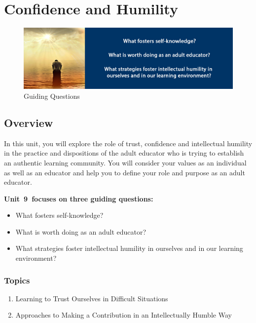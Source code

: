 \documentclass[
]{book}
\providecommand{\tightlist}{%
  \setlength{\itemsep}{0pt}\setlength{\parskip}{0pt}}
\begin{document}
\hypertarget{confidence-and-humility}{%
\chapter{Confidence and Humility}\label{confidence-and-humility}}

\begin{figure}
\centering
\includegraphics{assets/unit9/BannerUnit9.jpg}
\caption{Guiding Questions}
\end{figure}

\hypertarget{overview-8}{%
\section*{Overview}\label{overview-8}}

In this unit, you will explore the role of trust, confidence and intellectual humility in the practice and dispositions of the adult educator who is trying to establish an authentic learning community. You will consider your values as an individual as well as an educator and help you to define your role and purpose as an adult educator.

\textbf{Unit~9~focuses on three guiding questions:}

\begin{itemize}
\tightlist
\item
  What fosters self-knowledge?\\
\item
  What is worth doing as an adult educator?
\item
  What strategies foster intellectual humility in ourselves and in our learning environment?
\end{itemize}

\hypertarget{topics-8}{%
\subsection*{Topics}\label{topics-8}}

\begin{enumerate}
\def\labelenumi{\arabic{enumi}.}
\tightlist
\item
  Learning to Trust Ourselves in Difficult Situations\\
\item
  Approaches to Making a Contribution in an Intellectually Humble Way
\end{enumerate}
\end{document}
